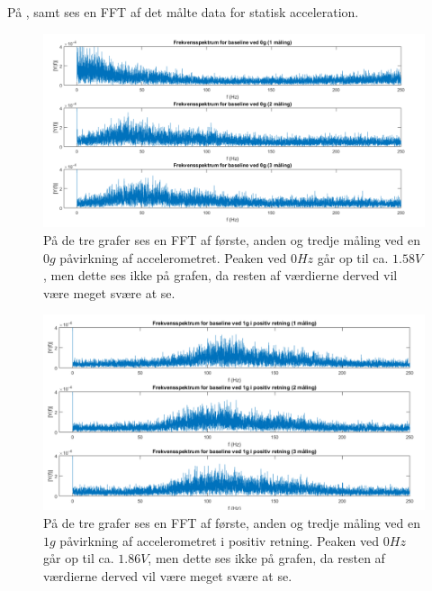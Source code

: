 På ,  samt  ses en FFT af det målte data for statisk acceleration.
\begin{figure}[H]
	\centering
	\includegraphics[scale=0.5]{figures/cProblemloesning/Pilotforsoeg_Frekvens0.png}
	\caption{På de tre grafer ses en FFT af første, anden og tredje måling ved en $0g$ påvirkning af accelerometret. Peaken ved $0Hz$ går op til ca. $1.58V$, men dette ses ikke på grafen, da resten af værdierne derved vil være meget svære at se.}
	\label{Fig:Pilot_FFT0}
\end{figure}
\begin{figure}[H]
	\centering
	\includegraphics[scale=0.5]{figures/cProblemloesning/Pilotforsoeg_FrekvensP.png}
	\caption{På de tre grafer ses en FFT af første, anden og tredje måling ved en $1g$ påvirkning af accelerometret i positiv retning. Peaken ved $0Hz$ går op til ca. $1.86V$, men dette ses ikke på grafen, da resten af værdierne derved vil være meget svære at se.}
	\label{Fig:Pilot_FFTP}
\end{figure}
